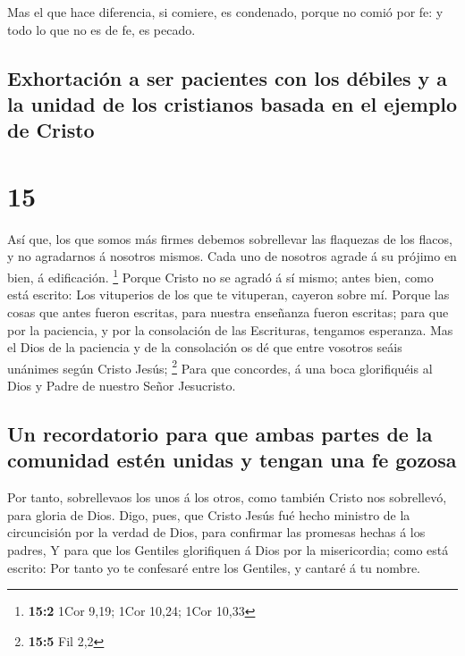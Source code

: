  Mas el que hace diferencia, si comiere, es condenado,
porque no comió por fe: y todo lo que no es de fe, es pecado.

\hypertarget{exhortaciuxf3n-a-ser-pacientes-con-los-duxe9biles-y-a-la-unidad-de-los-cristianos-basada-en-el-ejemplo-de-cristo}{%
\subsection{Exhortación a ser pacientes con los débiles y a la unidad de
los cristianos basada en el ejemplo de
Cristo}\label{exhortaciuxf3n-a-ser-pacientes-con-los-duxe9biles-y-a-la-unidad-de-los-cristianos-basada-en-el-ejemplo-de-cristo}}

\hypertarget{section-14}{%
\section{15}\label{section-14}}

 Así que, los que somos más firmes debemos sobrellevar las
flaquezas de los flacos, y no agradarnos á nosotros mismos. 
Cada uno de nosotros agrade á su prójimo en bien, á edificación.
\footnote{\textbf{15:2} 1Cor 9,19; 1Cor 10,24; 1Cor 10,33} 
Porque Cristo no se agradó á sí mismo; antes bien, como está escrito:
Los vituperios de los que te vituperan, cayeron sobre mí. 
Porque las cosas que antes fueron escritas, para nuestra enseñanza
fueron escritas; para que por la paciencia, y por la consolación de las
Escrituras, tengamos esperanza.  Mas el Dios de la paciencia
y de la consolación os dé que entre vosotros seáis unánimes según Cristo
Jesús; \footnote{\textbf{15:5} Fil 2,2}  Para que concordes,
á una boca glorifiquéis al Dios y Padre de nuestro Señor Jesucristo.

\hypertarget{un-recordatorio-para-que-ambas-partes-de-la-comunidad-estuxe9n-unidas-y-tengan-una-fe-gozosa}{%
\subsection{Un recordatorio para que ambas partes de la comunidad estén
unidas y tengan una fe
gozosa}\label{un-recordatorio-para-que-ambas-partes-de-la-comunidad-estuxe9n-unidas-y-tengan-una-fe-gozosa}}

 Por tanto, sobrellevaos los unos á los otros, como también
Cristo nos sobrellevó, para gloria de Dios.  Digo, pues, que
Cristo Jesús fué hecho ministro de la circuncisión por la verdad de
Dios, para confirmar las promesas hechas á los padres,  Y
para que los Gentiles glorifiquen á Dios por la misericordia; como está
escrito: Por tanto yo te confesaré entre los Gentiles, y cantaré á tu
nombre.

